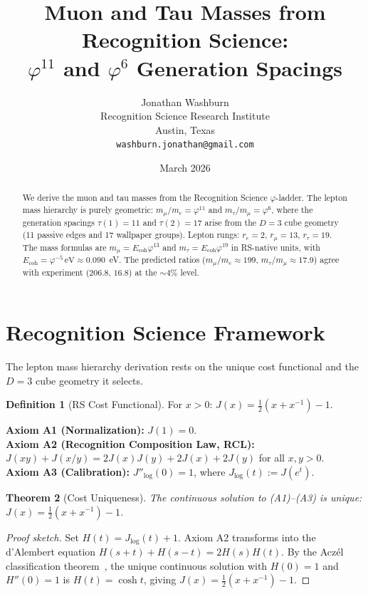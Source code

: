 \documentclass[12pt,a4paper]{article}
\title{Muon and Tau Masses from Recognition Science:\\
$\varphi^{11}$ and $\varphi^{6}$ Generation Spacings}
\author{Jonathan Washburn\\
Recognition Science Research Institute\\
Austin, Texas\\
\texttt{washburn.jonathan@gmail.com}}
\date{March 2026}
\newtheorem{theorem}{Theorem}[section]
\theoremstyle{definition}
\newtheorem{definition}[theorem]{Definition}
\theoremstyle{remark}
\begin{document}
\maketitle

\begin{abstract}
We derive the muon and tau masses from the Recognition Science
$\varphi$-ladder.  The lepton mass hierarchy is purely geometric:
$m_\mu/m_e = \varphi^{11}$ and $m_\tau/m_\mu = \varphi^{6}$, where
the generation spacings $\tau(1) = 11$ and $\tau(2) = 17$ arise
from the $D = 3$ cube geometry (11 passive edges and 17 wallpaper
groups).  Lepton rungs: $r_e = 2$, $r_\mu = 13$, $r_\tau = 19$.
The mass formulas are $m_\mu = E_{\mathrm{coh}} \varphi^{13}$ and
$m_\tau = E_{\mathrm{coh}} \varphi^{19}$ in RS-native units, with
$E_{\mathrm{coh}} = \varphi^{-5}\,\mathrm{eV} \approx 0.090$~eV.
The predicted ratios ($m_\mu/m_e \approx 199$, $m_\tau/m_\mu
\approx 17.9$) agree with experiment ($206.8$, $16.8$) at the
$\sim 4\%$ level.
\end{abstract}

\section{Recognition Science Framework}
\label{sec:framework}

The lepton mass hierarchy derivation rests on the unique cost
functional and the $D=3$ cube geometry it selects.

\begin{definition}[RS Cost Functional]
For $x > 0$: $J(x) = \tfrac{1}{2}(x + x^{-1}) - 1$.
\end{definition}

\noindent\textbf{Axiom A1 (Normalization):} $J(1) = 0$.\\
\textbf{Axiom A2 (Recognition Composition Law, RCL):}
$J(xy)+J(x/y)=2J(x)J(y)+2J(x)+2J(y)$ for all $x,y>0$.\\
\textbf{Axiom A3 (Calibration):} $J''_{\log}(0) = 1$, where
$J_{\log}(t) := J(e^t)$.

\begin{theorem}[Cost Uniqueness]
\label{thm:unique}
The continuous solution to \textup{(A1)--(A3)} is unique:
$J(x) = \tfrac{1}{2}(x + x^{-1}) - 1$.
\end{theorem}

\begin{proof}[Proof sketch]
Set $H(t) = J_{\log}(t)+1$.  Axiom A2 transforms into the d'Alembert
equation $H(s+t)+H(s-t)=2H(s)H(t)$.  By the Acz\'el classification
theorem~\cite{Aczel1966}, the unique continuous solution with $H(0)=1$
and $H''(0)=1$ is $H(t)=\cosh t$, giving
$J(x)=\tfrac{1}{2}(x+x^{-1})-1$.
\end{proof}
\end{document}
